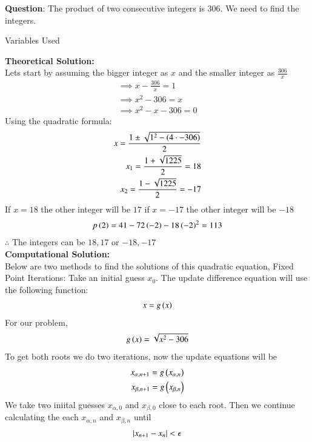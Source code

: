 \documentclass[journal]{IEEEtran}
\begin{document}
\textbf{Question}:\newline
The product of two consecutive integers is $306$. We need to find the integers.
\newline
\begin{table}[h!]    
  \centering
  
  \caption{Variables Used}
  \label{tab1.1.2.2}
\end{table}
\newline
\textbf{Theoretical Solution:}\\
Lets start by assuming the bigger integer as $x$ and the smaller integer as $\frac{306}{x}$
\begin{align}
    \implies x-\frac{306}{x}=1\\
    \implies x^2-306=x\\
    \implies x^2-x-306=0
\end{align}
Using the quadratic formula:
\begin{align}
    x=\frac{1\pm\sqrt{1^2-\left(4\cdot -306\right)}}{2}\\
    x_1=\frac{1+\sqrt{1225}}{2}=18\\
    x_2=\frac{1-\sqrt{1225}}{2}=-17
\end{align}
If $x=18$ the other integer will be $17$ if $x=-17$ the other integer will be $-18$
\begin{align}
    p\left(2\right)=41-72\left(-2\right)-18\left(-2\right)^2=113
\end{align}
$\therefore$ The integers can be $18,17$ or $-18,-17$\\
\textbf{Computational Solution:}\\
Below are two methods to find the solutions of this quadratic equation,
Fixed Point Iterations:
Take an initial guess $x_0$. The update difference equation will use the following function:
\begin{align}
    x = g\left(x\right)
\end{align}
For our problem,
\begin{align}
    g\left(x\right) = \sqrt{x^2-306}
\end{align}
To get both roots we do two iterations, now the update equations will be
\begin{align}
    x_{\alpha,n+1}=g\left(x_{\alpha,n}\right)\\
    x_{\beta,n+1}=g\left(x_{\beta,n}\right)\\
\end{align}
We take two iniital guesses $x_{\alpha,0}$ and $x_{\beta,0}$ close to each root. Then we continue calculating the each $x_{\alpha,n}$ and $x_{\beta,n}$ until
\begin{align}
    \left\vert x_{n+1}-x_n\right\vert<\epsilon
\end{align}
\end{document}
